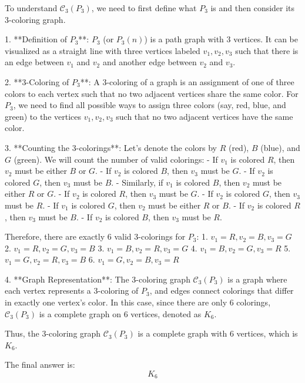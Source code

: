 To understand \(\mathcal{C}_3(P_3)\), we need to first define what \(P_3\) is and then consider its 3-coloring graph.

1. **Definition of \(P_3\)**:
   \(P_3\) (or \(P_3(n)\)) is a path graph with 3 vertices. It can be visualized as a straight line with three vertices labeled \(v_1, v_2, v_3\) such that there is an edge between \(v_1\) and \(v_2\) and another edge between \(v_2\) and \(v_3\).

2. **3-Coloring of \(P_3\)**:
   A 3-coloring of a graph is an assignment of one of three colors to each vertex such that no two adjacent vertices share the same color. For \(P_3\), we need to find all possible ways to assign three colors (say, red, blue, and green) to the vertices \(v_1, v_2, v_3\) such that no two adjacent vertices have the same color.

3. **Counting the 3-colorings**:
   Let's denote the colors by \(R\) (red), \(B\) (blue), and \(G\) (green). We will count the number of valid colorings:
   - If \(v_1\) is colored \(R\), then \(v_2\) must be either \(B\) or \(G\).
     - If \(v_2\) is colored \(B\), then \(v_3\) must be \(G\).
     - If \(v_2\) is colored \(G\), then \(v_3\) must be \(B\).
   - Similarly, if \(v_1\) is colored \(B\), then \(v_2\) must be either \(R\) or \(G\).
     - If \(v_2\) is colored \(R\), then \(v_3\) must be \(G\).
     - If \(v_2\) is colored \(G\), then \(v_3\) must be \(R\).
   - If \(v_1\) is colored \(G\), then \(v_2\) must be either \(R\) or \(B\).
     - If \(v_2\) is colored \(R\), then \(v_3\) must be \(B\).
     - If \(v_2\) is colored \(B\), then \(v_3\) must be \(R\).

   Therefore, there are exactly 6 valid 3-colorings for \(P_3\):
   1. \(v_1 = R, v_2 = B, v_3 = G\)
   2. \(v_1 = R, v_2 = G, v_3 = B\)
   3. \(v_1 = B, v_2 = R, v_3 = G\)
   4. \(v_1 = B, v_2 = G, v_3 = R\)
   5. \(v_1 = G, v_2 = R, v_3 = B\)
   6. \(v_1 = G, v_2 = B, v_3 = R\)

4. **Graph Representation**:
   The 3-coloring graph \(\mathcal{C}_3(P_3)\) is a graph where each vertex represents a 3-coloring of \(P_3\), and edges connect colorings that differ in exactly one vertex's color. In this case, since there are only 6 colorings, \(\mathcal{C}_3(P_3)\) is a complete graph on 6 vertices, denoted as \(K_6\).

Thus, the 3-coloring graph \(\mathcal{C}_3(P_3)\) is a complete graph with 6 vertices, which is \(K_6\).

The final answer is:
\[
\boxed{K_6}
\]